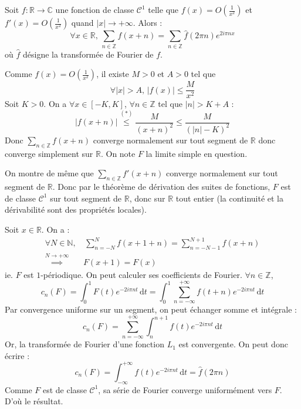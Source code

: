 


	
	
	
	\begin{theorem}
		\label{formule-sommatoire-de-poisson-1}
		Soit $f : \mathbb{R} \rightarrow \mathbb{C}$ une fonction de classe $\mathcal{C}^1$ telle que $f(x) = O \left( \frac{1}{x^2} \right)$ et $f'(x) = O \left( \frac{1}{x^2} \right)$ quand $|x| \longrightarrow +\infty$. Alors :
		\[ \forall x \in \mathbb{R}, \, \sum_{n \in \mathbb{Z}} f(x+n) = \sum_{n \in \mathbb{Z}} \widehat{f}(2 \pi n) e^{2 i \pi n x} \]
		où $\widehat{f}$ désigne la transformée de Fourier de $f$.
	\end{theorem}

	\begin{demonstration}
		Comme $f(x) = O \left( \frac{1}{x^2} \right)$, il existe $M > 0$ et $A > 0$ tel que
		\[ \forall |x| > A, \, |f(x)| \leq \frac{M}{x^2} \tag{$*$} \]
		Soit $K > 0$. On a $\forall x \in [-K, K]$, $\forall n \in \mathbb{Z}$ tel que $|n| > K + A$ :
		\[ |f(x+n)| \overset{(*)}{\leq} \frac{M}{(x+n)^2} \leq \frac{M}{(|n| - K)^2} \]
		Donc $\sum_{n \in \mathbb{Z}} f(x+n)$ converge normalement sur tout segment de $\mathbb{R}$ donc converge simplement sur $\mathbb{R}$. On note $F$ la limite simple en question.
		
		\medskip
		On montre de même que $\sum_{n \in \mathbb{Z}} f'(x+n)$ converge normalement sur tout segment de $\mathbb{R}$. Donc par le théorème de dérivation des suites de fonctions, $F$ est de classe $\mathcal{C}^1$ sur tout segment de $\mathbb{R}$, donc sur $\mathbb{R}$ tout entier (la continuité et la dérivabilité sont des propriétés locales).
		
		\medskip
		Soit $x \in \mathbb{R}$. On a :
		\begin{align*}
			\forall N \in \mathbb{N}, &\, \sum_{n=-N}^N f(x+1+n) = \sum_{n=-N-1}^{N+1} f(x+n) \\
			\overset{N \longrightarrow +\infty}{\implies} & F(x+1) = F(x)
		\end{align*}
		ie. $F$ est $1$-périodique. On peut calculer ses coefficients de Fourier. $\forall n \in \mathbb{Z}$,
		\[ c_n(F) = \int_0^1 F(t) e^{-2i\pi n t} \, \mathrm{d}t = \int_0^1 \sum_{n=-\infty}^{+\infty} f(t+n) e^{-2i\pi n t} \, \mathrm{d}t \]
		Par convergence uniforme sur un segment, on peut échanger somme et intégrale :
		\[ c_n(F) = \sum_{n=-\infty}^{+\infty} \int_n^{n+1} f(t) e^{-2i\pi n t} \, \mathrm{d}t \]
		Or, la transformée de Fourier d'une fonction $L_1$ est convergente. On peut donc écrire :
		\[ c_n(F) = \int_{-\infty}^{+\infty} f(t) e^{-2i\pi n t} \, \mathrm{d}t = \widehat{f}(2\pi n) \]
		Comme $F$ est de classe $\mathcal{C}^1$, sa série de Fourier converge uniformément vers $F$. D'où le résultat.
	\end{demonstration}

